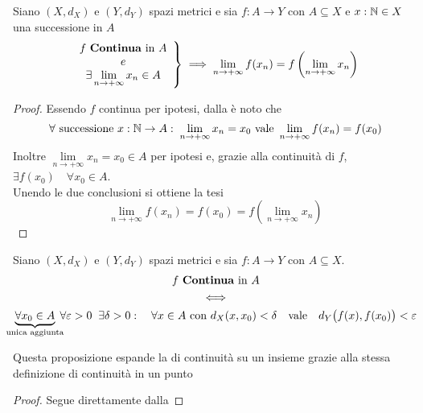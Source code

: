 \begin{corollary}
	Siano $(X,d_X)$ e $(Y,d_Y)$ spazi metrici e sia $f: A \to Y$ con $A \subseteq X$ e $x: \mathbb{N} \in X$ una successione in $A$
	\begin{equation*}
		\left.
		\begin{array}{c}
			f \text{ \textbf{Continua} in } A\\
			e\\
			\exists \lim\limits_{n \to +\infty} x_n \in A
		\end{array}
		\right\} \implies
		\lim\limits_{n \to +\infty} f(x_n) = f\left( \lim\limits_{n \to +\infty} x_n \right)
	\end{equation*}
	\begin{proof}
		Essendo $f$ continua per ipotesi, dalla  è noto che
		\[\forall \text{ successione } x:\mathbb{N} \to A:\; \lim\limits_{n \to +\infty} x_n = x_0 \text{ vale } \lim\limits_{n \to +\infty} f(x_n) = f(x_0)\]
		Inoltre $\lim\limits_{n \to +\infty} x_n = x_0 \in A$ per ipotesi e, grazie alla continuità di $f$, $\exists f(x_0) \quad \forall x_0 \in A$.\\
		Unendo le due conclusioni si ottiene la tesi
		\[\lim\limits_{n \to +\infty} f(x_n) = f(x_0) = f\left( \lim\limits_{n \to +\infty} x_n \right)\]
	\end{proof}
\end{corollary}

\begin{proposition}
	\label{prop:funz_cont_in_ins}
	Siano $(X,d_X)$ e $(Y,d_Y)$ spazi metrici e sia $f: A \to Y$ con $A \subseteq X$.
	\begin{equation*}
		\begin{gathered}
			f \text{ \textbf{Continua} in } A\\
			\iff\\
			\underbrace{\forall x_0 \in A}_{\mathclap{\text{unica aggiunta}}} \; \forall \varepsilon > 0\;\;\exists \delta > 0:\quad \forall x \in A \text{ con } d_X(x,x_0)<\delta \quad \text{vale} \quad d_Y \bigl(f(x),f(x_0)\bigr) < \varepsilon
		\end{gathered}
	\end{equation*}
	\vspace*{-\baselineskip}
	\begin{note}
		Questa proposizione espande la  di continuità su un insieme grazie alla stessa definizione di continuità in un punto
	\end{note}
	\begin{proof}
		Segue direttamente dalla 
	\end{proof}
\end{proposition}

